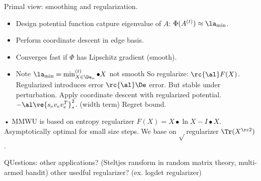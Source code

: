 Primal view: smoothing and regularization.
\begin{itemize}
\item
Design potential function catpure eigenvalue of $A$: $\Phi(A^{(t)})\approx \la_{\min}$. 
\item
Perform coordinate descent in edge basis.
\item  Converges fast if $\Phi$ has Lipschitz gradient (smooth).
\item
Note $\la_{\min}=\min_{X\in \De_n}^{(t)}\bullet X$ not smooth So regularize: $\rc{\al}F(X)$. Regularized introduces error $\rc{\al}\De$ error. But stable under perturbation. Apply coordinate descent with regularized potential. 
$-\al\ve{s_ev_ev_e^T}_*^2$. (width term) Regret bound.
\end{itemize}•
MMWU is based on entropy regularizer $F(X)=X\bullet \ln X-I\bullet X$. Asymptotically optimal for small size steps. We base on $\sqrt {} $regularizer $\Tr(X^{\rc 2})$. 

QUestions: other applications? (Steltjes ransform in random matrix theory, multi-armed bandit) other usedful regularizer? (ex. logdet regularizer)